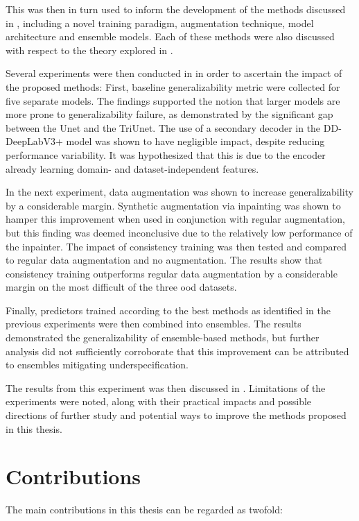 This was then in turn used to inform the development of the methods discussed in , including a novel training paradigm, augmentation technique, model architecture and ensemble models. Each of these methods were also discussed with respect to the theory explored in .

Several experiments were then conducted in  in order to ascertain the impact of the proposed methods:
First, baseline generalizability metric were collected for five separate models. The findings supported the notion that larger models are more prone to generalizability failure, as demonstrated by the significant gap between the Unet and the TriUnet. The use of a secondary decoder in the DD-DeepLabV3+ model was shown to have negligible impact, despite reducing performance variability. It was hypothesized that this is due to the encoder already learning domain- and dataset-independent features. 

In the next experiment, data augmentation was shown to increase generalizability by a considerable margin. Synthetic augmentation via inpainting was shown to hamper this improvement when used in conjunction with regular augmentation, but this finding was deemed inconclusive due to the relatively low performance of the inpainter. 
The impact of consistency training was then tested and compared to regular data augmentation and no augmentation. The results show that consistency training outperforms regular data augmentation by a considerable margin on the most difficult of the three \gls{ood} datasets. 

Finally, predictors trained according to the best methods as identified in the previous experiments were then combined into ensembles. The results demonstrated the generalizability of ensemble-based methods, but further analysis did not sufficiently corroborate that this improvement can be attributed to ensembles mitigating underspecification. 

The results from this experiment was then discussed in . Limitations of the experiments were noted, along with their practical impacts and possible directions of further study and potential ways to improve the methods proposed in this thesis. 


\section{Contributions}
The main contributions in this thesis can be regarded as twofold:

